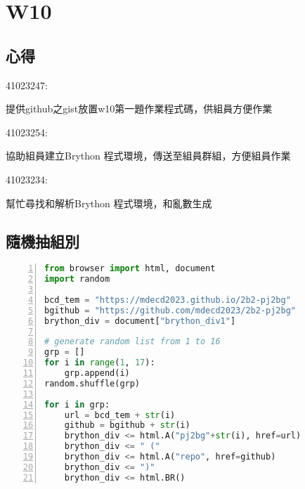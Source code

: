 \chapter{W10}
\section{心得}
41023247:

提供github之gist放置w10第一題作業程式碼，供組員方便作業

41023254:

協助組員建立Brython 程式環境，傳送至組員群組，方便組員作業

41023234:

幫忙尋找和解析Brython 程式環境，和亂數生成
\section{隨機抽組別}
\begin{lstlisting}[language=Python, frame=single, numbers=left, captionpos=b, basicstyle=\ttfamily\small, showstringspaces=false, breaklines=true, tabsize=4, xleftmargin=15pt]
from browser import html, document
import random

bcd_tem = "https://mdecd2023.github.io/2b2-pj2bg"
bgithub = "https://github.com/mdecd2023/2b2-pj2bg"
brython_div = document["brython_div1"]

# generate random list from 1 to 16
grp = []
for i in range(1, 17):
    grp.append(i)
random.shuffle(grp)

for i in grp:
    url = bcd_tem + str(i)
    github = bgithub + str(i)
    brython_div <= html.A("pj2bg"+str(i), href=url)
    brython_div <= " ("
    brython_div <= html.A("repo", href=github)
    brython_div <= ")"
    brython_div <= html.BR()
\end{lstlisting}